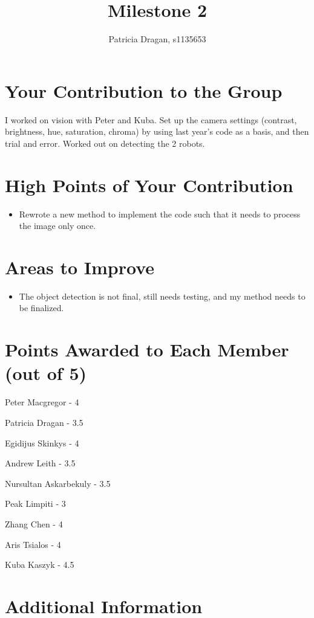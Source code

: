 \documentclass[dvips]{article}
\begin{document}
\sloppy
\title{Milestone 2}
 
\author{Patricia Dragan, s1135653}
 
\maketitle

\section{Your Contribution to the Group}
I worked on vision with Peter and Kuba. Set up the camera settings (contrast, brightness, hue, saturation, chroma) by using last year's code as a basis, and then trial and error. Worked out on detecting the 2 robots. 

\section{High Points of Your Contribution}
\begin{itemize}
  \item Rewrote a new method to implement the code such that it needs to process the image only once.
\end{itemize} 

\section{Areas to Improve}
\begin{itemize}
  \item The object detection is not final, still needs testing, and my method needs to be finalized.
\end{itemize}


\section{Points Awarded to Each Member (out of 5)}
\begin{itemize}
\begin{multicols}{2}
\item Peter Macgregor - 4
\item Patricia Dragan - 3.5
\item Egidijus Skinkys - 4
\item Andrew Leith - 3.5
\item Nursultan Askarbekuly - 3.5
\item Peak Limpiti - 3
\item Zhang Chen - 4
\item Aris Tsialos - 4 
\item Kuba Kaszyk - 4.5
\end{multicols}
\end{itemize}

\section{Additional Information}
\end{document}
